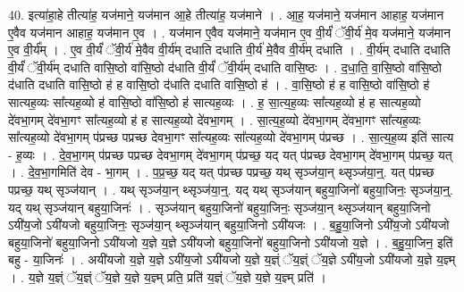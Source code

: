\documentclass[17pt]{extarticle}
\begin{document}
40. इत्या॑हा॒हे तीत्या॑ह॒ यज॑माने॒ यज॑मान आ॒हे तीत्या॑ह॒ यज॑माने । . आ॒ह॒ यज॑माने॒ यज॑मान आहाह॒ यज॑मान ए॒वैव यज॑मान आहाह॒ यज॑मान ए॒व । . यज॑मान ए॒वैव यज॑माने॒ यज॑मान ए॒व वी॒र्यं॑ ॅवी॒र्य॑ मे॒व यज॑माने॒ यज॑मान ए॒व वी॒र्य᳚म् । . ए॒व वी॒र्यं॑ ॅवी॒र्य॑ मे॒वैव वी॒र्य॑म् दधाति दधाति वी॒र्य॑ मे॒वैव वी॒र्य॑म् दधाति । . वी॒र्य॑म् दधाति दधाति वी॒र्यं॑ ॅवी॒र्य॑म् दधाति वासि॒ष्ठो वा॑सि॒ष्ठो द॑धाति वी॒र्यं॑ ॅवी॒र्य॑म् दधाति वासि॒ष्ठः । . द॒धा॒ति॒ वा॒सि॒ष्ठो वा॑सि॒ष्ठो द॑धाति दधाति वासि॒ष्ठो ह॑ ह वासि॒ष्ठो द॑धाति दधाति वासि॒ष्ठो ह॑ । . वा॒सि॒ष्ठो ह॑ ह वासि॒ष्ठो वा॑सि॒ष्ठो ह॑ सात्यह॒व्यः सा᳚त्यह॒व्यो ह॑ वासि॒ष्ठो वा॑सि॒ष्ठो ह॑ सात्यह॒व्यः । . ह॒ सा॒त्य॒ह॒व्यः सा᳚त्यह॒व्यो ह॑ ह सात्यह॒व्यो दे॑वभा॒गम् दे॑वभा॒गꣳ सा᳚त्यह॒व्यो ह॑ ह सात्यह॒व्यो दे॑वभा॒गम् । . सा॒त्य॒ह॒व्यो दे॑वभा॒गम् दे॑वभा॒गꣳ सा᳚त्यह॒व्यः सा᳚त्यह॒व्यो दे॑वभा॒गम् प॑प्रच्छ पप्रच्छ देवभा॒गꣳ सा᳚त्यह॒व्यः सा᳚त्यह॒व्यो दे॑वभा॒गम् प॑प्रच्छ । . सा॒त्य॒ह॒व्य इति॑ सात्य - ह॒व्यः । . दे॒व॒भा॒गम् प॑प्रच्छ पप्रच्छ देवभा॒गम् दे॑वभा॒गम् प॑प्रच्छ॒ यद् यत् प॑प्रच्छ देवभा॒गम् दे॑वभा॒गम् प॑प्रच्छ॒ यत् । . दे॒व॒भा॒गमिति॑ देव - भा॒गम् । . प॒प्र॒च्छ॒ यद् यत् प॑प्रच्छ पप्रच्छ॒ यथ् सृञ्ज॑या॒न् थ्सृञ्ज॑या॒न्॒. यत् प॑प्रच्छ पप्रच्छ॒ यथ् सृञ्ज॑यान् । . यथ् सृञ्ज॑या॒न् थ्सृञ्ज॑या॒न्॒. यद् यथ् सृञ्ज॑यान् बहुया॒जिनो॑ बहुया॒जिनः॒ सृञ्ज॑या॒न्॒. यद् यथ् सृञ्ज॑यान् बहुया॒जिनः॑ । . सृञ्ज॑यान् बहुया॒जिनो॑ बहुया॒जिनः॒ सृञ्ज॑या॒न् थ्सृञ्ज॑यान् बहुया॒जिनो ऽयी॑य॒जो ऽयी॑यजो बहुया॒जिनः॒ सृञ्ज॑या॒न् थ्सृञ्ज॑यान् बहुया॒जिनो ऽयी॑यजः । . ब॒हु॒या॒जिनो ऽयी॑य॒जो ऽयी॑यजो बहुया॒जिनो॑ बहुया॒जिनो ऽयी॑यजो य॒ज्ञे य॒ज्ञे ऽयी॑यजो बहुया॒जिनो॑ बहुया॒जिनो ऽयी॑यजो य॒ज्ञे । . ब॒हु॒या॒जिन॒ इति॑ बहु - या॒जिनः॑ । . अयी॑यजो य॒ज्ञे य॒ज्ञे ऽयी॑य॒जो ऽयी॑यजो य॒ज्ञे य॒ज्ञ्ं ॅय॒ज्ञ्ं ॅय॒ज्ञे ऽयी॑य॒जो ऽयी॑यजो य॒ज्ञे य॒ज्ञ्म् । . य॒ज्ञे य॒ज्ञ्ं ॅय॒ज्ञ्ं ॅय॒ज्ञे य॒ज्ञे य॒ज्ञ्म् प्रति॒ प्रति॑ य॒ज्ञ्ं ॅय॒ज्ञे य॒ज्ञे य॒ज्ञ्म् प्रति॑ । \newline
\pagebreak
{}
\end{document}

